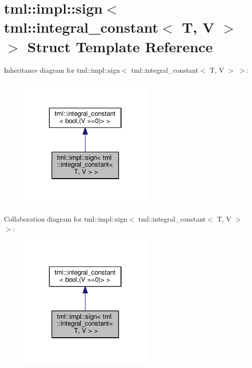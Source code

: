 \hypertarget{structtml_1_1impl_1_1sign_3_01tml_1_1integral__constant_3_01_t_00_01_v_01_4_01_4}{\section{tml\+:\+:impl\+:\+:sign$<$ tml\+:\+:integral\+\_\+constant$<$ T, V $>$ $>$ Struct Template Reference}
\label{structtml_1_1impl_1_1sign_3_01tml_1_1integral__constant_3_01_t_00_01_v_01_4_01_4}
}


Inheritance diagram for tml\+:\+:impl\+:\+:sign$<$ tml\+:\+:integral\+\_\+constant$<$ T, V $>$ $>$\+:
\nopagebreak
\begin{figure}[H]
\begin{center}
\leavevmode
\includegraphics[width=190pt]{structtml_1_1impl_1_1sign_3_01tml_1_1integral__constant_3_01_t_00_01_v_01_4_01_4__inherit__graph}
\end{center}
\end{figure}


Collaboration diagram for tml\+:\+:impl\+:\+:sign$<$ tml\+:\+:integral\+\_\+constant$<$ T, V $>$ $>$\+:
\nopagebreak
\begin{figure}[H]
\begin{center}
\leavevmode
\includegraphics[width=190pt]{structtml_1_1impl_1_1sign_3_01tml_1_1integral__constant_3_01_t_00_01_v_01_4_01_4__coll__graph}
\end{center}
\end{figure}

